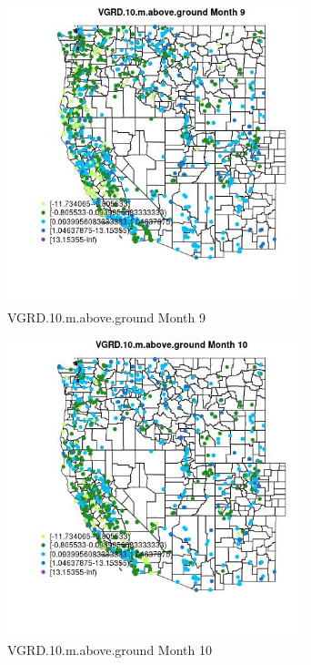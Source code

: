 \begin{figure} 
\centering  
\includegraphics[width=0.77\textwidth]{Code_Outputs/Report_ML_input_PM25_Step4_part_f_de_duplicated_aveswNAs_MapObsMo9VGRD10maboveground.jpg} 
\caption{\label{fig:Report_ML_input_PM25_Step4_part_f_de_duplicated_aveswNAsMapObsMo9VGRD10maboveground}VGRD.10.m.above.ground Month 9} 
\end{figure} 
 

\begin{figure} 
\centering  
\includegraphics[width=0.77\textwidth]{Code_Outputs/Report_ML_input_PM25_Step4_part_f_de_duplicated_aveswNAs_MapObsMo10VGRD10maboveground.jpg} 
\caption{\label{fig:Report_ML_input_PM25_Step4_part_f_de_duplicated_aveswNAsMapObsMo10VGRD10maboveground}VGRD.10.m.above.ground Month 10} 
\end{figure} 
 

